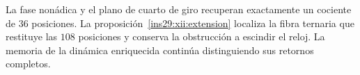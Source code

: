 La fase nonádica y el plano de cuarto de giro recuperan exactamente un
cociente de \(36\) posiciones. La proposición~\ref{ins29:xii:extension}
localiza la fibra ternaria que restituye las \(108\) posiciones y conserva
la obstrucción a escindir el reloj. La memoria de la dinámica enriquecida
continúa distinguiendo sus retornos completos.

